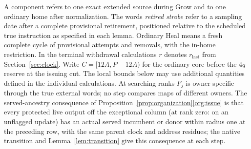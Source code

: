 A component refers to one exact extended source during Grow and to one ordinary home after normalization. The words \emph{retired strobe} refer to a sampling date after a complete provisional retirement, positioned relative to the scheduled true instruction as specified in each lemma. Ordinary Heal means a fresh complete cycle of provisional attempts and removals, with the in-home restriction. In the terminal withdrawal calculations \(r\) denotes \(r_{\mathrm{last}}\) from Section~\ref{sec:clock}. Write \(C=[12A,P-12A)\) for the ordinary core before the \(4q\) reserve at the issuing cut. The local bounds below may use additional quantities defined in the individual calculations. At searching ranks \(F_j\) is owner-specific through the true external words; no step compares maps of different owners. The served-ancestry consequence of Proposition~\ref{prop:organization}\ref{org:issue} is that every protected live output off the exceptional column (at rank zero: on an unflagged update) has an actual served incumbent or donor within radius one at the preceding row, with the same parent clock and address residues; the native transition and Lemma~\ref{lem:transition} give this consequence at each step.



